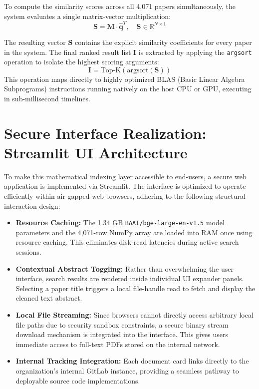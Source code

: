 \documentclass[12pt,a4paper]{article}
\begin{document}
To compute the similarity scores across all 4,071 papers simultaneously, the system evaluates a single matrix-vector multiplication:
\begin{equation}
    \mathbf{S} = \mathbf{M} \cdot \hat{\mathbf{q}}^T, \quad \mathbf{S} \in \mathbb{R}^{N \times 1}
\end{equation}

The resulting vector $\mathbf{S}$ contains the explicit similarity coefficients for every paper in the system. The final ranked result list $\mathbf{I}$ is extracted by applying the \texttt{argsort} operation to isolate the highest scoring arguments:
\begin{equation}
    \mathbf{I} = \text{Top-K}(\text{argsort}(\mathbf{S}))
\end{equation}
This operation maps directly to highly optimized BLAS (Basic Linear Algebra Subprograms) instructions running natively on the host CPU or GPU, executing in sub-millisecond timelines.

\section{Secure Interface Realization: Streamlit UI Architecture}
To make this mathematical indexing layer accessible to end-users, a secure web application is implemented via Streamlit. The interface is optimized to operate efficiently within air-gapped web browsers, adhering to the following structural interaction design:

\begin{itemize}
    \item \textbf{Resource Caching:} The 1.34 GB \texttt{BAAI/bge-large-en-v1.5} model parameters and the 4,071-row NumPy array are loaded into RAM once using resource caching. This eliminates disk-read latencies during active search sessions.
    \item \textbf{Contextual Abstract Toggling:} Rather than overwhelming the user interface, search results are rendered inside individual UI expander panels. Selecting a paper title triggers a local file-handle read to fetch and display the cleaned text abstract.
    \item \textbf{Local File Streaming:} Since browsers cannot directly access arbitrary local file paths due to security sandbox constraints, a secure binary stream download mechanism is integrated into the interface. This gives users immediate access to full-text PDFs stored on the internal network.
    \item \textbf{Internal Tracking Integration:} Each document card links directly to the organization's internal GitLab instance, providing a seamless pathway to deployable source code implementations.
\end{itemize}
\end{document}
